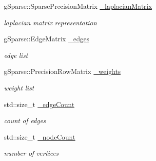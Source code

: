 \begin{DoxyCompactItemize}
\mbox{\label{classg_sparse_1_1_undirected_graph_aafd3eaa27352e7f6f282e788717c2db3}} 
g\+Sparse\+::\+Sparse\+Precision\+Matrix \mbox{\hyperlink{classg_sparse_1_1_undirected_graph_aafd3eaa27352e7f6f282e788717c2db3}{\+\_\+laplacian\+Matrix}}
\begin{DoxyCompactList}\small\item\em laplacian matrix representation \end{DoxyCompactList}\item 
\mbox{\label{classg_sparse_1_1_undirected_graph_a19665449e89f16fc75cdee3c165f3c47}} 
g\+Sparse\+::\+Edge\+Matrix \mbox{\hyperlink{classg_sparse_1_1_undirected_graph_a19665449e89f16fc75cdee3c165f3c47}{\+\_\+edges}}
\begin{DoxyCompactList}\small\item\em edge list \end{DoxyCompactList}\item 
\mbox{\label{classg_sparse_1_1_undirected_graph_a89a63f601898c7bf5342632a919ce4a4}} 
g\+Sparse\+::\+Precision\+Row\+Matrix \mbox{\hyperlink{classg_sparse_1_1_undirected_graph_a89a63f601898c7bf5342632a919ce4a4}{\+\_\+weights}}
\begin{DoxyCompactList}\small\item\em weight list \end{DoxyCompactList}\item 
\mbox{\label{classg_sparse_1_1_undirected_graph_ab10bc8ab3defed1dae0ecf2438d1022e}} 
std\+::size\+\_\+t \mbox{\hyperlink{classg_sparse_1_1_undirected_graph_ab10bc8ab3defed1dae0ecf2438d1022e}{\+\_\+edge\+Count}}
\begin{DoxyCompactList}\small\item\em count of edges \end{DoxyCompactList}\item 
\mbox{\label{classg_sparse_1_1_undirected_graph_a800146dca9f76f0b55a2f4e19d7016fc}} 
std\+::size\+\_\+t \mbox{\hyperlink{classg_sparse_1_1_undirected_graph_a800146dca9f76f0b55a2f4e19d7016fc}{\+\_\+node\+Count}}
\begin{DoxyCompactList}\small\item\em number of vertices \end{DoxyCompactList}\end{DoxyCompactItemize}
